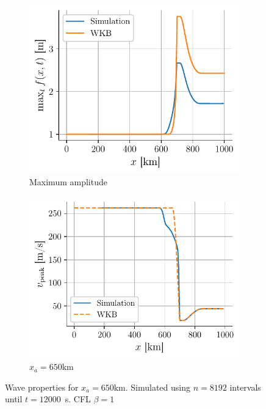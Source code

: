 \begin{figure}[H]
    \centering
    \begin{subfigure}{0.48\linewidth}
        \centering
        \includegraphics[width=\linewidth]{figures/corail_eq1_amplitude_xa=650000.0.pdf}
        \caption{Maximum amplitude}
        \label{fig:corail_eq1_amplitude_xa=65km}
    \end{subfigure}
    \begin{subfigure}{0.48\linewidth}
        \centering
        \includegraphics[width=\linewidth]{figures/corail_eq1_vitesse_xa=650000.0.pdf}
        \caption{\(x_a = 650\)km}
        \label{fig:corail_eq1_speed_xa=65km}
    \end{subfigure}
    \caption{Wave properties for \(x_a = 650\)km. Simulated using \(n=8192\) intervals until \hbox{\(t=12000\) \si{\second}}. CFL \(\beta=1\)}
\end{figure}


